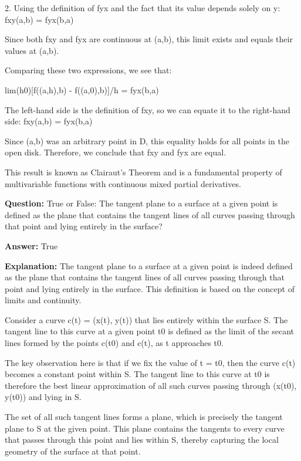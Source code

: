 \documentclass{article}
\begin{document}
2. Using the definition of fyx and the fact that its value depends solely on y:
fxy(a,b) = fyx(b,a)

Since both fxy and fyx are continuous at (a,b), this limit exists and equals their values at (a,b). 

Comparing these two expressions, we see that:

lim(h{\textrightarrow}0)[f((a,h),b) - f((a,0),b)]/h = fyx(b,a)

The left-hand side is the definition of fxy, so we can equate it to the right-hand side:
fxy(a,b) = fyx(b,a)

Since (a,b) was an arbitrary point in D, this equality holds for all points in the open disk. Therefore, we conclude that fxy and fyx are equal.

This result is known as Clairaut's Theorem and is a fundamental property of multivariable functions with continuous mixed partial derivatives.
                
                \vspace{0.5cm} 
        
            
                \textbf {Question:} True or False: The tangent plane to a surface at a given point is defined as the plane that contains the tangent lines of all curves passing through that point and lying entirely in the surface?
                
                \textbf{Answer:} True

                \textbf{Explanation:} The tangent plane to a surface at a given point is indeed defined as the plane that contains the tangent lines of all curves passing through that point and lying entirely in the surface. This definition is based on the concept of limits and continuity.

Consider a curve c(t) = (x(t), y(t)) that lies entirely within the surface S. The tangent line to this curve at a given point t0 is defined as the limit of the secant lines formed by the points c(t0) and c(t), as t approaches t0.

The key observation here is that if we fix the value of t = t0, then the curve c(t) becomes a constant point within S. The tangent line to this curve at t0 is therefore the best linear approximation of all such curves passing through (x(t0), y(t0)) and lying in S.

The set of all such tangent lines forms a plane, which is precisely the tangent plane to S at the given point. This plane contains the tangents to every curve that passes through this point and lies within S, thereby capturing the local geometry of the surface at that point.
\end{document}
